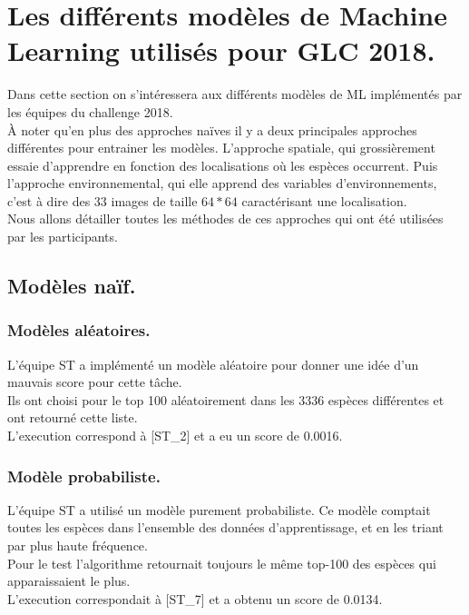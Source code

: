 \documentclass{article}
\begin{document}
\section{Les différents modèles de Machine Learning utilisés pour GLC 2018.}
Dans cette section on s'intéressera aux différents modèles de ML implémentés par les équipes du challenge 2018.\\
À noter qu'en plus des approches naïves il y a deux principales approches différentes pour entrainer les modèles. L'approche spatiale, qui grossièrement essaie d'apprendre en fonction des localisations où les espèces occurrent. Puis l'approche environnemental, qui elle apprend des variables d'environnements, c'est à dire des 33 images de taille $64*64$ caractérisant une localisation.\\ Nous allons détailler toutes les méthodes de ces approches qui ont été utilisées par les participants.

\subsection{Modèles naïf.}
\subsubsection{Modèles aléatoires.}
L'équipe ST a implémenté un modèle aléatoire pour donner une idée d'un mauvais score pour cette tâche.\\Ils ont choisi pour le top 100 aléatoirement dans les 3336 espèces différentes et ont retourné cette liste.\\ L'execution correspond à [ST\_2] et a eu un score de 0.0016.

\subsubsection{Modèle probabiliste.}
L'équipe ST a utilisé  un modèle purement probabiliste. Ce modèle comptait toutes les espèces dans l'ensemble des données d'apprentissage, et en les triant par plus haute fréquence.\\Pour le test l'algorithme retournait toujours le même top-100 des espèces qui apparaissaient le plus.\\L'execution correspondait à [ST\_7] et a obtenu un score de 0.0134.
\end{document}
